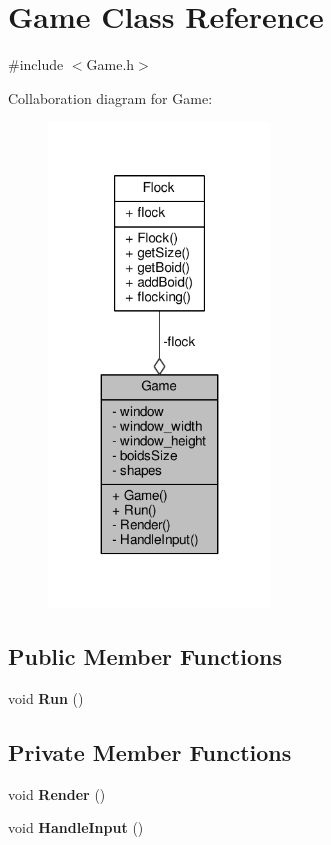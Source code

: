\hypertarget{class_game}{}\section{Game Class Reference}
\label{class_game}


{\ttfamily \#include $<$Game.\+h$>$}



Collaboration diagram for Game\+:
\nopagebreak
\begin{figure}[H]
\begin{center}
\leavevmode
\includegraphics[width=167pt]{class_game__coll__graph}
\end{center}
\end{figure}
\subsection*{Public Member Functions}
\begin{DoxyCompactItemize}
\item 
void {\bfseries Run} ()\hypertarget{class_game_a96341ca5b54d90adc3ecb3bf0bcd2312}{}\label{class_game_a96341ca5b54d90adc3ecb3bf0bcd2312}

\end{DoxyCompactItemize}
\subsection*{Private Member Functions}
\begin{DoxyCompactItemize}
\item 
void {\bfseries Render} ()\hypertarget{class_game_a0897730fc9fed789f6c0f11d21a0c14a}{}\label{class_game_a0897730fc9fed789f6c0f11d21a0c14a}

\item 
void {\bfseries Handle\+Input} ()\hypertarget{class_game_a6cb82eaece4e30724f3fe4e0d4bde5fc}{}\label{class_game_a6cb82eaece4e30724f3fe4e0d4bde5fc}

\end{DoxyCompactItemize}
